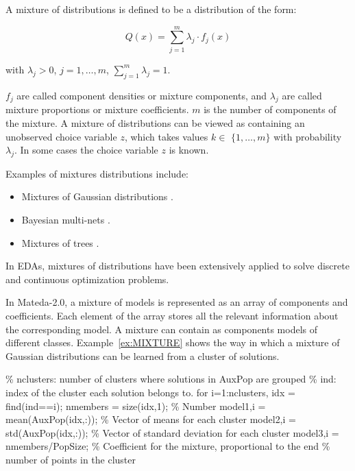 \documentclass[a4paper]{article}
\begin{document}
 A mixture of distributions \cite{Everitt_and_Hand:1981,McLachlan_and_Basford:1988} is defined to be a distribution of the form:

\begin{equation}
   Q(x)=\sum\limits_{j=1}^m\lambda _j \cdot f_j(x)  \label{eq:Mixture}
\end{equation}

with $\lambda _j > 0$, $j=1,\dots,m$, $\sum_{j=1}^m\lambda _j=1$.


$f_j$ are called component densities or  mixture components, and
$\lambda _j$ are called mixture proportions or mixture
coefficients. $m$ is the number   of components of the mixture. A
mixture of distributions can be viewed as containing an unobserved
choice variable $z$, which takes values $k\in $ $\{1,\dots,m\}$ with
probability $\lambda _j$. In some cases the choice variable $z$ is
known.

 Examples of mixtures distributions include:
 \begin{itemize}
  \item Mixtures of Gaussian distributions \cite{Everitt_and_Hand:1981}.
  \item Bayesian multi-nets \cite{Geiger_and_Heckerman:1996}.
  \item Mixtures of trees \cite{Meila_and_Jordan:2000}.
 \end{itemize}

  In EDAs, mixtures of distributions have been extensively applied
  to solve discrete \cite{Bosman_and_Thierens:2002,Pelikan_and_Goldberg:2000,Penha_et_al:2002,Santana_et_al:2001b,Santana_et_al:2006a}
   and continuous \cite{Bosman_and_Thierens:2002,Cho_and_Zhang:2002,Gallagher:2000,Thierens_and_Bosman:2001a} optimization problems.

 In Mateda-2.0, a mixture of models is represented as an array of
 components and coefficients. Each element of the array stores all
 the relevant information about the corresponding model. A mixture
 can contain as components models of different classes.
 Example~\ref{ex:MIXTURE} shows the way in which a mixture of
 Gaussian distributions can be learned from a cluster of solutions.

\begin{example}
\begin{programf}
 \% nclusters: number of clusters where solutions in AuxPop are
 grouped
 \% ind: index of the cluster each solution belongs to.
 for i=1:nclusters,
   idx = find(ind==i);
   nmembers = size(idx,1); \% Number
   model{1,i} =  mean(AuxPop(idx,:)); \% Vector of means for each cluster
   model{2,i} =  std(AuxPop(idx,:));  \% Vector of standard deviation for each cluster
   model{3,i} =  nmembers/PopSize;    \% Coefficient for the mixture, proportional to the
 end                  \UnnumLine         \% number of points in the cluster
   \end{programf}
\label{ex:MIXTURE} \end{example}
\end{document}
